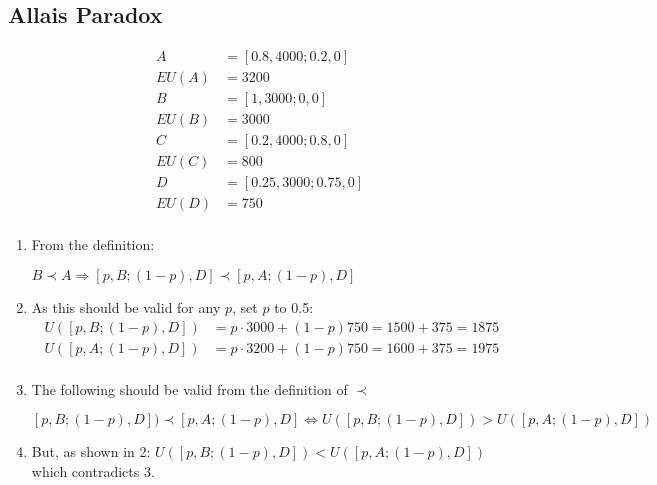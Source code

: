 \documentclass[fleqn,12pt]{scrartcl}
\begin{document}
\subsection{Allais Paradox}
\begin{align*}
	A &= [0.8, 4000; 0.2, 0]\\
	EU(A) &= 3200\\
	B &= [1, 3000; 0, 0]\\
	EU(B) &= 3000\\
	C &= [0.2, 4000; 0.8, 0]\\
	EU(C) &= 800\\
	D &= [0.25, 3000; 0.75, 0]\\
	EU(D) &= 750\\
\end{align*}
\begin{enumerate}
\item From the definition:

	$B \prec A \Rightarrow [p, B;(1-p),D] \prec [p, A; (1-p), D]$
\item
	As this should be valid for any $p$, set $p$ to 0.5:
	\begin{align*}
		U([p,B;(1-p),D]) &= p\cdot 3000 + (1-p)750 = 1500 + 375 = 1875\\
		U([p,A;(1-p),D]) &= p\cdot 3200 + (1-p)750 = 1600 + 375 = 1975\\
	\end{align*}

\item
	The following should be valid from the definition of $\prec$

	$[p,B;(1-p),D]) \prec [p,A;(1-p),D] \Leftrightarrow U([p,B;(1-p),D]) > U([p,A;(1-p),D])$

\item
	But, as shown in 2: $U([p,B;(1-p),D]) < U([p,A;(1-p),D])$ which contradicts 3.

\end{enumerate}
\end{document}
